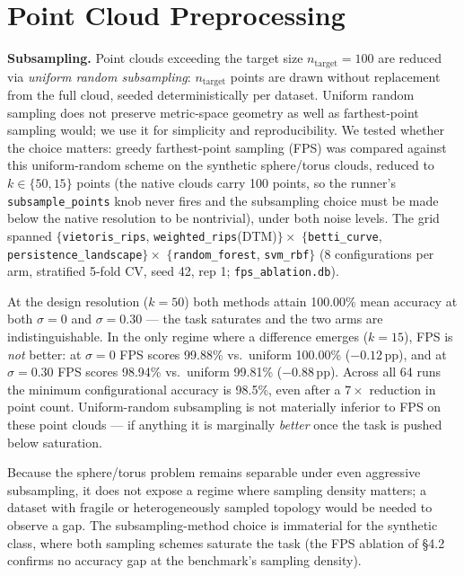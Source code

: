 \documentclass[12pt, a4paper]{report}
\theoremstyle{definition}
\theoremstyle{plain}
\theoremstyle{remark}
\begin{document}
\section{Point Cloud Preprocessing}

\textbf{Subsampling.} Point clouds exceeding the target size
$n_{\text{target}} = 100$ are reduced via \emph{uniform random
subsampling}: $n_{\text{target}}$ points are drawn without
replacement from the full cloud, seeded deterministically per
dataset. Uniform random sampling does not preserve metric-space
geometry as well as farthest-point sampling would; we use it for
simplicity and reproducibility. We tested whether the choice matters:
greedy farthest-point sampling (FPS) was compared against this
uniform-random scheme on the synthetic sphere/torus clouds, reduced to
$k \in \{50, 15\}$ points (the native clouds carry 100 points, so the
runner's \texttt{subsample\_points} knob never fires and the
subsampling choice must be made below the native resolution to be
nontrivial), under both noise levels. The grid spanned
$\{$\texttt{vietoris\_rips}, \texttt{weighted\_rips}(DTM)$\} \times$
$\{$\texttt{betti\_curve}, \texttt{persistence\_landscape}$\} \times$
$\{$\texttt{random\_forest}, \texttt{svm\_rbf}$\}$
(8 configurations per arm, stratified 5-fold CV, seed 42, rep 1;
\texttt{fps\_ablation.db}).

At the design resolution ($k{=}50$) both
methods attain 100.00\% mean accuracy at both $\sigma{=}0$ and
$\sigma{=}0.30$ --- the task saturates and the two arms are
indistinguishable. In the only regime where a difference emerges
($k{=}15$), FPS is \emph{not} better: at $\sigma{=}0$ FPS scores
99.88\% vs.\ uniform 100.00\% ($-0.12$\,pp), and at $\sigma{=}0.30$
FPS scores 98.94\% vs.\ uniform 99.81\% ($-0.88$\,pp). Across all 64
runs the minimum configurational accuracy is 98.5\%, even after a
$7\times$ reduction in point count. Uniform-random
subsampling is not materially inferior to FPS on these point clouds ---
if anything it is marginally \emph{better} once the task is pushed
below saturation.

Because the sphere/torus problem remains
separable under even aggressive subsampling, it does not expose a
regime where sampling density matters; a dataset with fragile or
heterogeneously sampled topology would be needed to observe a gap. The
subsampling-method choice is immaterial for the synthetic
class, where both sampling schemes saturate the task (the FPS
ablation of \S4.2 confirms no accuracy gap at the benchmark's
sampling density).
\end{document}
